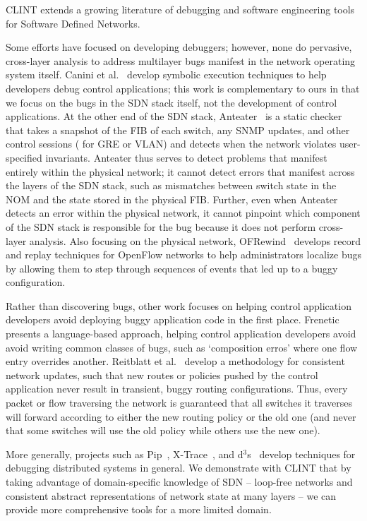     CLINT extends a growing literature of debugging and software engineering tools for Software Defined Networks.
    
    Some efforts have focused on developing debuggers; however, none do pervasive, cross-layer analysis to address multilayer bugs manifest in the network operating system itself. 
    Canini et al.~\cite{canini} develop symbolic execution techniques to help developers debug control applications; this work is complementary to ours in that we focus on the bugs in the SDN stack itself, not the development of control applications.   
    At the other end of the SDN stack, Anteater~\cite{anteater} is a static checker that takes a snapshot of the FIB of each switch, any SNMP updates, and other control sessions (\eg{} for GRE or VLAN) and detects when the network violates user-specified invariants.
    Anteater thus serves to detect problems that manifest entirely within the physical network; it cannot detect errors that manifest across the layers of the SDN stack, such as mismatches between switch state in the NOM and the state stored in the physical FIB.
    Further, even when Anteater detects an error within the physical network, it cannot pinpoint which component of the SDN stack is responsible for the bug because it does not perform cross-layer analysis.
    Also focusing on the physical network, OFRewind~\cite{ofrewind} develops record and replay techniques for OpenFlow networks to help administrators localize bugs by allowing them to step through sequences of events that led up to a buggy configuration.

    Rather than  discovering bugs, other work focuses on helping control application developers avoid deploying buggy application code in the first place. 
    Frenetic~\cite{frenetic} presents a language-based approach, helping control application developers avoid avoid writing common classes of bugs, such as `composition erros' where one flow entry overrides another.
    Reitblatt et al.~\cite{consistentupdates}  develop a methodology for consistent network updates, such that new routes or policies pushed by the control application never result in transient, buggy routing configurations.
    Thus, every packet or flow traversing the network is guaranteed that all switches it traverses will forward according to either the new routing policy or the old one (and never that some switches will use the old policy while others use the new one). 

    More generally, projects such as Pip~\cite{pip}, X-Trace~\cite{xtrace}, and d$^3$s~\cite{d3s} develop techniques for debugging distributed systems in general.
    We demonstrate with CLINT that by taking advantage of domain-specific knowledge of SDN -- \eg{} loop-free networks and consistent abstract representations of network state at many layers -- we can provide more comprehensive tools for a more limited domain. 

